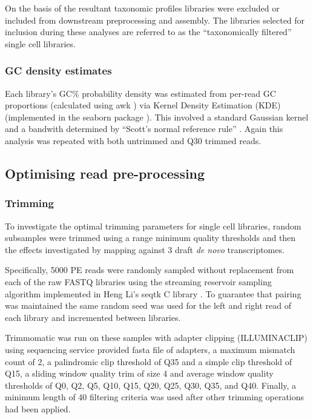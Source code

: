 On the basis of the resultant taxonomic profiles libraries were excluded or included
from downstream preprocessing and assembly. The libraries selected for inclusion during these analyses 
are referred to as the ``taxonomically filtered'' single cell libraries.

\subsubsection{GC density estimates}

Each library's GC\% probability density was estimated from per-read GC proportions
(calculated using awk \citep{Aho1987}) via Kernel Density Estimation (KDE) \citep{Rosenblatt1956,Parzen1962} 
(implemented in the seaborn package \citep{michael_waskom_2015_19108}).
This involved a standard Gaussian kernel and a bandwith determined by ``Scott's normal reference rule'' \citep{Scott1979}.  
Again this analysis was repeated with both untrimmed and Q30 trimmed reads. 

\subsection{Optimising read pre-processing}

\subsubsection{Trimming}

To investigate the optimal trimming parameters for single cell libraries, 
random subsamples were trimmed using a range minimum quality thresholds and then the effects investigated
by mapping against 3 draft \textit{de novo} transcriptomes.

Specifically, 5000 PE reads were randomly sampled without replacement from each of the raw FASTQ libraries 
using the streaming reservoir sampling \citep{Vitter1985} algorithm implemented in Heng Li's 
seqtk C library \citep{SeqtkGitHub}.
To guarantee that pairing was maintained the same random seed was used for the left and right read
of each library and incremented between libraries.

Trimmomatic \citep{Bolger2014a} was run on these samples with adapter clipping (ILLUMINACLIP)
using sequencing service provided fasta file of adapters, a maximum mismatch count of 2,
a palindromic clip threshold of Q35 and a simple clip threshold of Q15, a sliding window
quality trim of size 4 and average window quality thresholds of Q0, Q2, Q5, Q10, Q15, Q20, Q25, Q30, Q35, and Q40.
Finally, a minimum length of \SI{40}{\bp} filtering criteria was used after other trimming operations had been applied.


